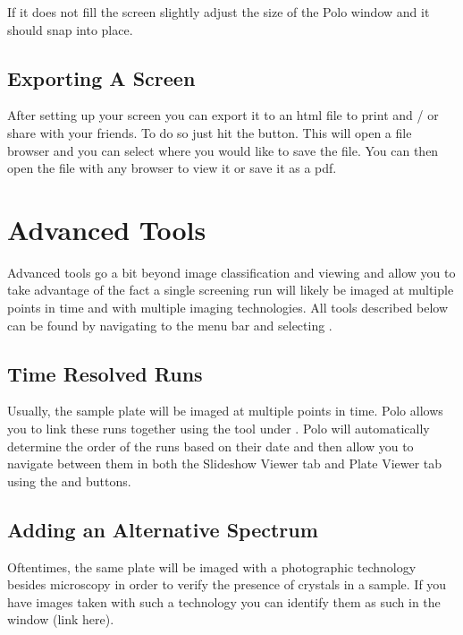\documentclass[letterpaper,10pt,english]{sphinxmanual}
\begin{document}
If it does not fill the screen slightly adjust the size of the Polo window and
it should snap into place.


\subsection{Exporting A Screen}
\label{\detokenize{user_guide:exporting-a-screen}}
After setting up your screen you can export it to an html file to print
and / or share with your friends. To do so just hit the  button.
This will open a file browser and you can select where you would like to
save the file. You can then open the file with any browser to view it or
save it as a pdf.


\section{Advanced Tools}
\label{\detokenize{user_guide:advanced-tools}}
Advanced tools go a bit beyond image classification and viewing and allow you
to take advantage of the fact a single screening run will likely be imaged at
multiple points in time and with multiple imaging technologies. All tools
described below can be found by navigating to the menu bar and selecting
.


\subsection{Time Resolved Runs}
\label{\detokenize{user_guide:time-resolved-runs}}
Usually, the sample plate will be imaged at multiple points in time. Polo allows
you to link these runs together using the  tool under
. Polo will automatically determine the order of the runs
based on their date and then allow you to navigate between them in both
the Slideshow Viewer tab and Plate Viewer tab using the  and
 buttons.


\subsection{Adding an Alternative Spectrum}
\label{\detokenize{user_guide:adding-an-alternative-spectrum}}
Oftentimes, the same plate will be imaged with a photographic technology
besides microscopy in order to verify the presence of crystals in a sample.
If you have images taken with such a technology you can identify them as such
in the  window (link here).
\end{document}
